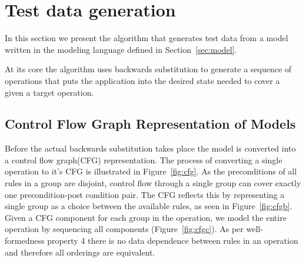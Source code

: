 \section{Test data generation}

In this section we present the algorithm that generates test data
from a model written in the modeling language defined in
Section~\ref{sec:model}. 

At its core the algorithm uses backwards substitution to generate a
sequence of operations that puts the application into the desired
state needed to cover a given a target operation. 

\subsection{Control Flow Graph Representation of Models}
\label{sec:control-flow-graph}

Before the actual backwards substitution takes place the model is
converted into a control flow graph(CFG) representation. The process of
converting a single operation to it's CFG is
illustrated in Figure~\ref{fig:cfg}. As the preconditions of all rules in
a group are disjoint, control flow through a single group can cover
exactly one precondition-post condition pair. The CFG reflects this by
representing a single group as a choice between the available rules, as
seen in Figure~\ref{fig:cfgb}. Given a CFG component for each group in
the operation, we model the entire operation by sequencing all
components (Figure~\ref{fig:cfgc}). As per well-formedness property 4
there is no data dependence between rules in an operation and therefore
all orderings are equivalent.

